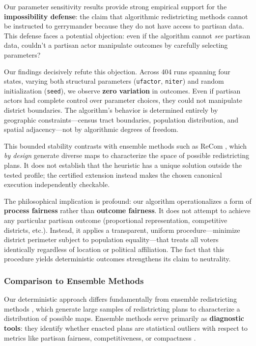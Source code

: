 Our parameter sensitivity results provide strong empirical support for the \textbf{impossibility defense}: the claim that algorithmic redistricting methods cannot be instructed to gerrymander because they do not have access to partisan data. This defense faces a potential objection: even if the algorithm cannot \textit{see} partisan data, couldn't a partisan actor manipulate outcomes by carefully selecting parameters?

Our findings decisively refute this objection. Across 404 runs spanning four states, varying both structural parameters (\texttt{ufactor}, \texttt{niter}) and random initialization (\texttt{seed}), we observe \textbf{zero variation} in outcomes. Even if partisan actors had complete control over parameter choices, they could not manipulate district boundaries. The algorithm's behavior is determined entirely by geographic constraints---census tract boundaries, population distribution, and spatial adjacency---not by algorithmic degrees of freedom.

This bounded stability contrasts with ensemble methods such as ReCom \citep{deford2019}, which \textit{by design} generate diverse maps to characterize the space of possible redistricting plans. It does not establish that the heuristic has a unique solution outside the tested profile; the certified extension instead makes the chosen canonical execution independently checkable.

The philosophical implication is profound: our algorithm operationalizes a form of \textbf{process fairness} rather than \textbf{outcome fairness}. It does not attempt to achieve any particular partisan outcome (proportional representation, competitive districts, etc.). Instead, it applies a transparent, uniform procedure---minimize district perimeter subject to population equality---that treats all voters identically regardless of location or political affiliation. The fact that this procedure yields deterministic outcomes strengthens its claim to neutrality.

\subsubsection{Comparison to Ensemble Methods}
\label{sec:ensemble-comparison}

Our deterministic approach differs fundamentally from ensemble redistricting methods \citep{chen2013unintentional, deford2019}, which generate large samples of redistricting plans to characterize a distribution of possible maps. Ensemble methods serve primarily as \textbf{diagnostic tools}: they identify whether enacted plans are statistical outliers with respect to metrics like partisan fairness, competitiveness, or compactness \citep{chen2013unintentional}.

